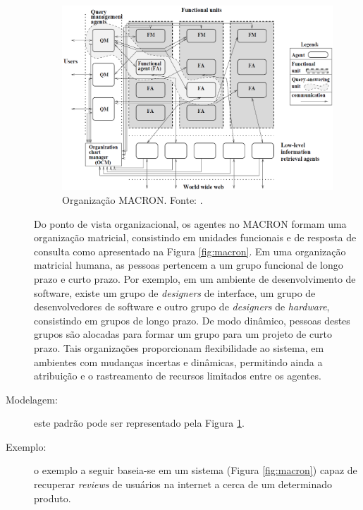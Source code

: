 \begin{description}
    

    \begin{figure}[h!]
    \centering
    \includegraphics[scale=0.7]{figuras/macron/macron2.png}
    \caption{Organização MACRON. Fonte: .}
    \label{fig:macron2}
\end{figure}
    
Do ponto de vista organizacional, os agentes no MACRON formam uma organização matricial, consistindo em unidades funcionais e de resposta de consulta como apresentado na Figura \ref{fig:macron}. Em uma organização matricial humana, as pessoas pertencem a um grupo funcional de longo prazo e curto prazo. Por exemplo,  em um ambiente de desenvolvimento de software, existe um grupo de \textit{designers} de interface, um grupo de desenvolvedores de software e outro grupo de \textit{designers} de \textit{hardware}, consistindo em grupos de longo prazo. De modo dinâmico, pessoas destes grupos são alocadas para formar um grupo para um projeto de curto prazo. Tais organizações proporcionam flexibilidade ao sistema, em ambientes com mudanças incertas e dinâmicas, permitindo ainda a atribuição e o rastreamento de recursos limitados entre os agentes.

\item[Modelagem:] este padrão pode ser representado pela Figura \ref{fig:macron2}.

\item[Exemplo:] o exemplo a seguir baseia-se em um sistema (Figura \ref{fig:macron}) capaz de recuperar \textit{reviews} de usuários na internet a cerca de um determinado produto.



\end{description}
